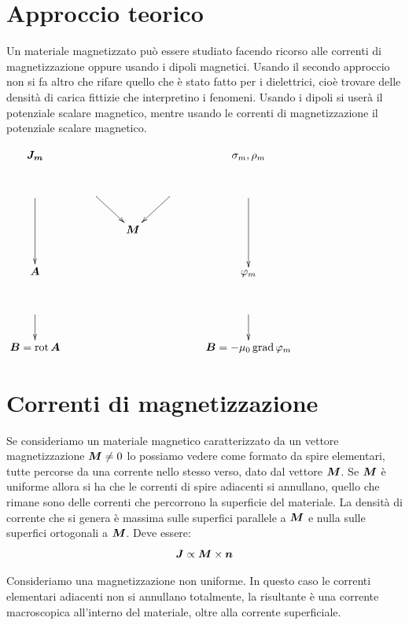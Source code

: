\section{Approccio teorico}
Un materiale magnetizzato può essere studiato facendo ricorso alle correnti di magnetizzazione oppure usando i dipoli magnetici. Usando il secondo approccio non si fa altro che rifare quello che è stato fatto per i dielettrici, cioè trovare delle densità di carica fittizie che interpretino i fenomeni. Usando i dipoli si userà il potenziale scalare magnetico, mentre usando le correnti di magnetizzazione il potenziale scalare magnetico.
\begin{center}
$
\xymatrix{
\ve{J_m}&&&&\sigma_m,\rho_m\\
\ar[dd]&\ar[dr]&&\ar[dl]&\ar[dd]\\
&&\ve M&&\\
\ve A&&&&\varphi_m\\
\ar[d]&&&&\ar[d]\\
\ve B=\rot\ve A&&&&\ve B=-\mu_0\grad\varphi_m
}$\end{center}
\section{Correnti di magnetizzazione}
Se consideriamo un materiale magnetico caratterizzato da un vettore magnetizzazione $\boldsymbol{M}\neq 0$ lo possiamo vedere come formato da spire elementari, tutte percorse da una corrente nello stesso verso, dato dal vettore $\boldsymbol{M}$. Se $\boldsymbol{M}$ è uniforme allora si ha che le correnti di spire adiacenti si annullano, quello che rimane sono delle correnti che percorrono la superficie del materiale. La densità di corrente che si genera è massima sulle superfici parallele a $\boldsymbol{M}$ e nulla sulle superfici ortogonali a $\boldsymbol{M}$. Deve essere:
\begin{equation*}
\boldsymbol{J}\propto \boldsymbol{M}\times\boldsymbol{n}
\end{equation*}

Consideriamo una magnetizzazione non uniforme. In questo caso le correnti elementari adiacenti non si annullano totalmente, la risultante è una corrente macroscopica all'interno del materiale, oltre alla corrente superficiale.

